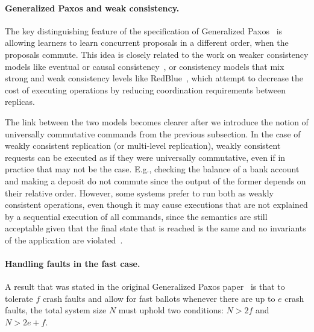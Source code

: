 
\paragraph{\textbf{Generalized Paxos and weak consistency}.}


The key distinguishing feature of the specification of Generalized
Paxos~\cite{Lamport2005} is allowing learners to learn concurrent
proposals in a different order, when the proposals commute. This idea
is closely related to the work on weaker consistency models like eventual or
causal consistency~\cite{Ahamad1995}, or consistency models that mix
strong and weak consistency levels like RedBlue~\cite{Li2012}, which attempt
to decrease the cost of executing operations by reducing coordination
requirements between replicas. 

The link between the two models becomes clearer after we introduce the
notion of universally commutative commands from the previous subsection.
In the case of weakly consistent replication (or multi-level replication),
weakly consistent requests can be executed as if they were universally
commutative, even if in practice that may not be the case. E.g., checking 
the balance of a bank account and making a deposit do not commute since
the output of the former depends on their relative order. However,
some systems prefer to run both as weakly consistent operations, even
though it may cause executions that are not explained by a sequential
execution of all commands, since the semantics are still acceptable given
that the final state that is reached is the same and no invariants 
of the application are violated~\cite{Li2012}.





\paragraph{\textbf{Handling faults in the fast case}.}

A result that was stated in the original Generalized Paxos
paper~\cite{Lamport2005} is that to tolerate $f$ crash faults and
allow for fast ballots whenever there are up to $e$ crash faults, the
total system size $N$ must uphold two conditions:
$N > 2f$ and $N > 2e+f$.

